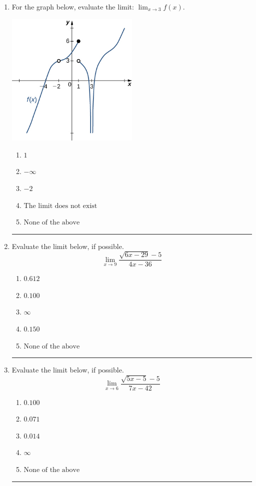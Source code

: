 \documentclass[14pt]{extbook}
\newcommand{\litem}[1]{\item#1\hspace*{-1cm}\rule{\textwidth}{0.4pt}}
\begin{document}
\begin{enumerate}
{\begin{enumerate}[label=\Alph*.]
\end{enumerate} }
\litem{
For the graph below, evaluate the limit: $ \displaystyle \lim_{x \rightarrow 3} f(x)$.
\begin{center}
    \includegraphics[width=0.5\textwidth]{../Figures/evaluateLimitGraphicallyCopyB.png}
\end{center}
\begin{enumerate}[label=\Alph*.]
\item \( 1 \)
\item \( -\infty \)
\item \( -2 \)
\item \( \text{The limit does not exist} \)
\item \( \text{None of the above} \)

\end{enumerate} }
\litem{
Evaluate the limit below, if possible.\[ \lim_{x \rightarrow 9} \frac{\sqrt{6x - 29} - 5}{4x - 36} \]\begin{enumerate}[label=\Alph*.]
\item \( 0.612 \)
\item \( 0.100 \)
\item \( \infty \)
\item \( 0.150 \)
\item \( \text{None of the above} \)

\end{enumerate} }
\litem{
Evaluate the limit below, if possible.\[ \lim_{x \rightarrow 6} \frac{\sqrt{5x - 5} - 5}{7x - 42} \]\begin{enumerate}[label=\Alph*.]
\item \( 0.100 \)
\item \( 0.071 \)
\item \( 0.014 \)
\item \( \infty \)
\item \( \text{None of the above} \)


\end{enumerate}}
\end{enumerate}
\end{document}

